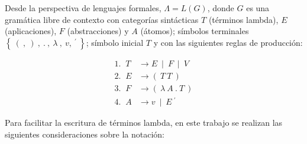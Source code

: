Desde la perspectiva de lenguajes formales, \(\Lambda = L(G)\), donde \(G\) es
una gramática libre de contexto con categorías sintácticas \(T\) (términos
lambda), \(E\) (aplicaciones), \(F\) (abstracciones) y \(A\) (átomos); símbolos
terminales \(\left\{\ (\ ,\ )\ ,\ .\ ,\ \lambda\ ,\ v,\ {}^{\prime}\
\right\}\); símbolo inicial \(T\) y con las siguientes reglas de producción:

\begin{align*}
  \text{1.  }\ T &\rightarrow  E\ \mid\ F\ \mid\ V\\
  \text{2.  }\ E &\rightarrow  (\ T\ T\ )\\
  \text{3.  }\ F &\rightarrow  (\ \lambda\ A\ .\ T\ )\\
  \text{4.  }\ A &\rightarrow  v\ \mid\ E\ {}^{\prime}
\end{align*}

Para facilitar la escritura de términos lambda, en este trabajo se realizan las
siguientes consideraciones sobre la notación:

